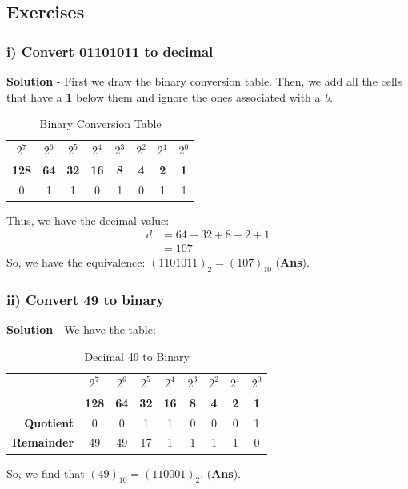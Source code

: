 \subsection{Exercises}
\subsubsection{i) Convert 01101011 to decimal}
\textbf{Solution} - First we draw the binary conversion table. Then, we add all the cells that have a \textbf{1} below them and ignore the ones associated with a \textit{0}.

\begin{table}[H]
	\centering
	\begin{tabular}{cccccccc}
		\toprule
		$2^7$ &$2^6$ &$2^5$ &$2^4$ &$2^3$ &$2^2$ &$2^1$ &$2^0$ \\
		\textbf{128} &\textbf{64} &\textbf{32} &\textbf{16} &\textbf{8} &\textbf{4} &\textbf{2} &\textbf{1} \\
		\midrule
		0 &1 &1 &0 &1 &0 &1 &1 \\
		\bottomrule
	\end{tabular}
	\vspace{-5pt}
	\caption{Binary Conversion Table}
\end{table}
\vspace{-10pt}
\noindent
Thus, we have the decimal value:
\begin{align*}
	d &= 64 + 32 + 8 + 2 + 1\\
	&= 107
\end{align*}
\noindent
So, we have the equivalence: $(1101011)_2 = (107)_{10}$ (\textbf{Ans}).

\subsubsection{ii) Convert 49 to binary}
\textbf{Solution} - We have the table:
\begin{table}[H]
	\centering
	\begin{tabular}{rcccccccc}
		\toprule
		&$2^7$ &$2^6$ &$2^5$ &$2^4$ &$2^3$ &$2^2$ &$2^1$ &$2^0$ \\
		&\textbf{128} &\textbf{64} &\textbf{32} &\textbf{16} &\textbf{8} &\textbf{4} &\textbf{2} &\textbf{1} \\
		\midrule
		\textbf{Quotient}  &0  &0  &1  &1 &0 &0 &0 &1 \\
		\midrule
		\textbf{Remainder} &49 &49 &17 &1 &1 &1 &1 &0 \\
		\bottomrule
	\end{tabular}
	\vspace{-5pt}
	\caption{Decimal 49 to Binary}
\end{table}
\vspace{-10pt}
\noindent
So, we find that $(49)_{10} = (110001)_2$. (\textbf{Ans}).

